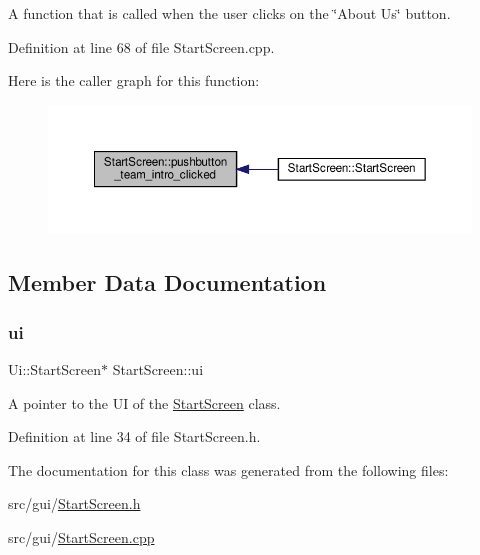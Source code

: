 A function that is called when the user clicks on the \char`\"{}\+About Us\char`\"{} button. 

Definition at line 68 of file Start\+Screen.\+cpp.

Here is the caller graph for this function\+:
\nopagebreak
\begin{figure}[H]
\begin{center}
\leavevmode
\includegraphics[width=350pt]{class_start_screen_a5b2dcf2fc1bf0bae99674a1d2f7c4771_icgraph}
\end{center}
\end{figure}


\subsection{Member Data Documentation}
\mbox{\label{class_start_screen_a2213dadd46a5ff18a6b9ef1063077ef0}} 
\subsubsection{\texorpdfstring{ui}{ui}}
{\footnotesize\ttfamily Ui\+::\+Start\+Screen$\ast$ Start\+Screen\+::ui\hspace{0.3cm}{\ttfamily [private]}}



A pointer to the UI of the \hyperlink{class_start_screen}{Start\+Screen} class. 



Definition at line 34 of file Start\+Screen.\+h.



The documentation for this class was generated from the following files\+:\begin{DoxyCompactItemize}
\item 
src/gui/\hyperlink{_start_screen_8h}{Start\+Screen.\+h}\item 
src/gui/\hyperlink{_start_screen_8cpp}{Start\+Screen.\+cpp}\end{DoxyCompactItemize}
